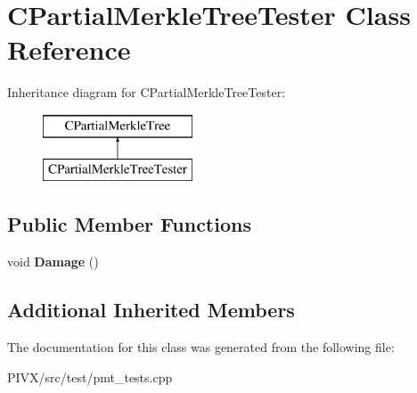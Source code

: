 \hypertarget{class_c_partial_merkle_tree_tester}{}\section{C\+Partial\+Merkle\+Tree\+Tester Class Reference}
\label{class_c_partial_merkle_tree_tester}
Inheritance diagram for C\+Partial\+Merkle\+Tree\+Tester\+:\begin{figure}[H]
\begin{center}
\leavevmode
\includegraphics[height=2.000000cm]{class_c_partial_merkle_tree_tester}
\end{center}
\end{figure}
\subsection*{Public Member Functions}
\begin{DoxyCompactItemize}
\item 
\mbox{\label{class_c_partial_merkle_tree_tester_a16ba9afcb58236df8fdf58cd545a4110}} 
void {\bfseries Damage} ()
\end{DoxyCompactItemize}
\subsection*{Additional Inherited Members}


The documentation for this class was generated from the following file\+:\begin{DoxyCompactItemize}
\item 
P\+I\+V\+X/src/test/pmt\+\_\+tests.\+cpp\end{DoxyCompactItemize}

